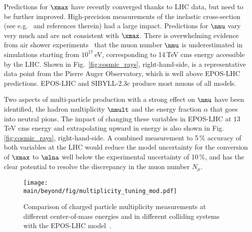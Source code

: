 \documentclass[../report.tex]{subfiles}
\providecommand{\main}{..}
\begin{document}
Predictions for $\xmax$ have recently converged thanks to LHC data, but need to be further improved. High-precision measurements of the inelastic cross-section (see e.g.~\cite{Aaij:2018okq} and references therein) had a large impact. Predictions for $\nmu$ vary very much and are not consistent with $\xmax$. There is overwhelming evidence from air shower experiments~\cite{Dembinski:2018UHECR,Aab:2014pza,Dembinski:2017zkb,Kokoulin:2009zz,Abbasi:2018fkz} that the muon number $\nmu$ is underestimated in simulations starting from $10^{17}$\,eV, corresponding to 14\,TeV cms energy accessible by the LHC. Shown in Fig.~\ref{fig:cosmic_rays}, right-hand-side, is a representative data point from the Pierre Auger Observatory, which is well above EPOS-LHC predictions. EPOS-LHC and SIBYLL-2.3c produce most muons of all models.



Two aspects of multi-particle production with a strong effect on $\nmu$ have been identified\cite{Ulrich:2010rg}, the hadron multiplicity $\nmult$ and the energy fraction $\alpha$ that goes into neutral pions. The impact of changing these variables in EPOS-LHC at $13$\,TeV cms energy and extrapolating upward in energy is also shown in Fig.\ref{fig:cosmic_rays}, right-hand-side. A combined measurement to 5\,\% accuracy of both variables at the LHC would reduce the model uncertainty for the conversion of $\xmax$ to $\mlna$ well below the experimental uncertainty of 10\,\%, and has the clear potential to resolve the discrepancy in the muon number $N_\mu$.

\begin{figure}
\texttt{[image: \\main/beyond/fig/multiplicity\_tuning\_mod.pdf]}
\caption{Comparison of charged particle multiplicity measurements at different center-of-mass energies and in different colliding systems with the EPOS-LHC model~\cite{Kim:2018ink}.}
\label{fig:multiplicity_tuning}
\end{figure}
\end{document}
